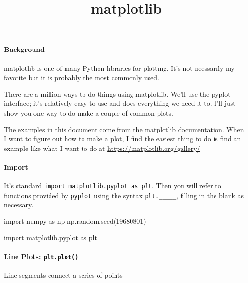 \documentclass[]{extarticle}
\title{matplotlib}
\author{}
\date{}
\newenvironment{Shaded}{\begin{snugshade}}{\end{snugshade}}
\newcommand{\DecValTok}[1]{\textcolor[rgb]{0.86,0.86,0.80}{#1}}
\newcommand{\ImportTok}[1]{\textcolor[rgb]{0.80,0.80,0.80}{#1}}
\newcommand{\NormalTok}[1]{\textcolor[rgb]{0.80,0.80,0.80}{#1}}
\let\oldparagraph\paragraph
\renewcommand{\paragraph}[1]{\oldparagraph{#1}\mbox{}}
\begin{document}
\maketitle

\hypertarget{background}{%
\paragraph{Background}\label{background}}

matplotlib is one of many Python libraries for plotting. It's not
neessarily my favorite but it is probably the most commonly used.

There are a million ways to do things using matplotlib. We'll use the
pyplot interface; it's relatively easy to use and does everything we
need it to. I'll just show you one way to do make a couple of common
plots.

The examples in this document come from the matplotlib documentation.
When I want to figure out how to make a plot, I find the easiest thing
to do is find an example like what I want to do at
\url{https://matplotlib.org/gallery/}

\hypertarget{import}{%
\paragraph{Import}\label{import}}

It's standard \texttt{import\ matplotlib.pyplot\ as\ plt}. Then you will
refer to functions provided by \texttt{pyplot} using the syntax
\texttt{plt.\_\_\_\_\_}, filling in the blank as necessary.

\begin{Shaded}
\begin{Highlighting}[]
\ImportTok{import}\NormalTok{ numpy }\ImportTok{as}\NormalTok{ np}
\NormalTok{np.random.seed(}\DecValTok{19680801}\NormalTok{)}

\ImportTok{import}\NormalTok{ matplotlib.pyplot }\ImportTok{as}\NormalTok{ plt}
\end{Highlighting}
\end{Shaded}

\hypertarget{line-plots-plt.plot}{%
\paragraph{\texorpdfstring{Line Plots:
\texttt{plt.plot()}}{Line Plots: plt.plot()}}\label{line-plots-plt.plot}}

Line segments connect a series of points
\end{document}
